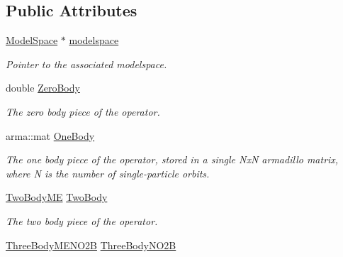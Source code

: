 \subsection*{Public Attributes}
\begin{DoxyCompactItemize}
\item 
\hypertarget{classOperator_af08ef1c6d3ef38d08b4a6ea20b26ef22}{\hyperlink{classModelSpace}{Model\-Space} $\ast$ \hyperlink{classOperator_af08ef1c6d3ef38d08b4a6ea20b26ef22}{modelspace}}\label{classOperator_af08ef1c6d3ef38d08b4a6ea20b26ef22}

\begin{DoxyCompactList}\small\item\em Pointer to the associated modelspace. \end{DoxyCompactList}\item 
\hypertarget{classOperator_a2f9f1109333a2485083cc7c090f9cd26}{double \hyperlink{classOperator_a2f9f1109333a2485083cc7c090f9cd26}{Zero\-Body}}\label{classOperator_a2f9f1109333a2485083cc7c090f9cd26}

\begin{DoxyCompactList}\small\item\em The zero body piece of the operator. \end{DoxyCompactList}\item 
\hypertarget{classOperator_a14b1c78e0be45772aa57168c74d1b57c}{arma\-::mat \hyperlink{classOperator_a14b1c78e0be45772aa57168c74d1b57c}{One\-Body}}\label{classOperator_a14b1c78e0be45772aa57168c74d1b57c}

\begin{DoxyCompactList}\small\item\em The one body piece of the operator, stored in a single Nx\-N armadillo matrix, where N is the number of single-\/particle orbits. \end{DoxyCompactList}\item 
\hypertarget{classOperator_add51ac69970faff9936192fec4181e00}{\hyperlink{classTwoBodyME}{Two\-Body\-M\-E} \hyperlink{classOperator_add51ac69970faff9936192fec4181e00}{Two\-Body}}\label{classOperator_add51ac69970faff9936192fec4181e00}

\begin{DoxyCompactList}\small\item\em The two body piece of the operator. \end{DoxyCompactList}\item 
\hypertarget{classOperator_ada4214f20105cf1784f21a3efdc17098}{\hyperlink{classThreeBodyMENO2B}{Three\-Body\-M\-E\-N\-O2\-B} \hyperlink{classOperator_ada4214f20105cf1784f21a3efdc17098}{Three\-Body\-N\-O2\-B}}\label{classOperator_ada4214f20105cf1784f21a3efdc17098}


\end{DoxyCompactItemize}
